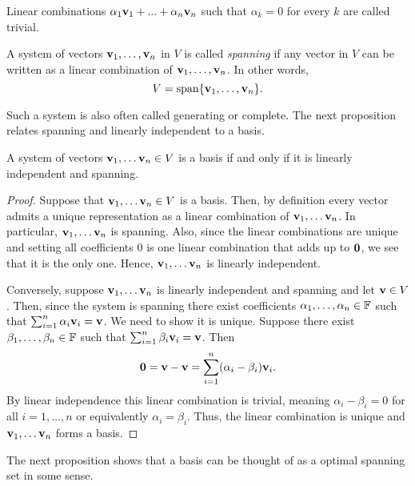 \documentclass{article}
\begin{document}
Linear combinations  $\alpha_{1}{\mathbf{v}}_{1}+...+\alpha_{n}{\mathbf{v}}_{n}$  such that  $\alpha_k = 0$ for every $k$ are called trivial.

\begin{definition}
 A system of vectors ${\mathbf{v}}_1,\ldots,{\mathbf{v}}_n$ in $V$ is called \emph{spanning}  if any vector in $V$ can be written as a linear combination of ${\mathbf{v}}_1,\ldots,{\mathbf{v}}_n$. In other words,
\begin{equation*}
    V = \mathrm{span}\{{\mathbf{v}}_1,\ldots,{\mathbf{v}}_n\}.
\end{equation*}
\end{definition}

Such a system is also often called generating or complete. The next proposition relates spanning and linearly independent to a basis. 

\begin{proposition}
\label{prop:lin_indep_span_basis}
 A system of vectors ${\mathbf{v}}_1, \ldots {\mathbf{v}}_n \in V$ is a basis if and only if it is linearly independent and spanning.
\end{proposition}

\begin{proof}
Suppose that ${\mathbf{v}}_1, \ldots {\mathbf{v}}_n \in V$ is a basis. Then, by definition every vector admits a unique representation as a linear combination of ${\mathbf{v}}_1, \ldots {\mathbf{v}}_n$. In particular, ${\mathbf{v}}_1, \ldots {\mathbf{v}}_n$ is spanning. Also, since the linear combinations are unique and setting all coefficients 0 is one linear combination that adds up to ${\mathbf{0}}$, we see that it is the only one. Hence, ${\mathbf{v}}_1, \ldots {\mathbf{v}}_n$ is linearly independent.

Conversely, suppose ${\mathbf{v}}_1, \ldots {\mathbf{v}}_n$ is linearly independent and spanning and let ${\mathbf{v}}\in V$. Then, since the system is spanning there exist coefficients $\alpha_1,\ldots, \alpha_n\in {\mathbb{F}}$ such that $\sum_{i=1}^n \alpha_i {\mathbf{v}}_i = {\mathbf{v}}$. We need to show it is unique. Suppose there exist $\beta_1,\ldots, \beta_n \in {\mathbb{F}}$ such that $\sum_{i=1}^n \beta_i {\mathbf{v}}_i = {\mathbf{v}}$. Then
\begin{equation*}
    {\mathbf{0}} = {\mathbf{v}} - {\mathbf{v}} = \sum_{i=1}^n (\alpha_i - \beta_i) {\mathbf{v}}_i.
\end{equation*}
By linear independence this linear combination is trivial, meaning $\alpha_i -\beta_i = 0$ for all $i=1,\ldots,n$ or equivalently $\alpha_i =\beta_i$. Thus, the linear combination is unique and ${\mathbf{v}}_1, \ldots {\mathbf{v}}_n$ forms a basis. 
\end{proof}

The next proposition shows that a basis can be thought of as a optimal spanning set in some sense. 
\end{document}
